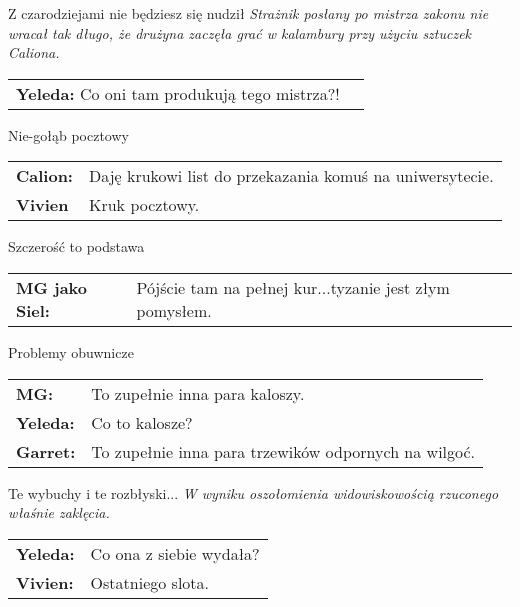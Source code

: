 \documentclass[10pt,twoside,twocolumn]{book}
\begin{document}
\begin{rpg-quotebox}{Z czarodziejami nie będziesz się nudził}
   \textit{Strażnik posłany po mistrza zakonu nie wracał tak długo, że drużyna zaczęła grać w kalambury przy użyciu sztuczek Caliona.} \\

   \begin{tabularx}{\columnwidth}{lX}
      \textbf{Yeleda:} Co oni tam produkują tego mistrza?! 
   \end{tabularx}
\end{rpg-quotebox}


\begin{rpg-quotebox}{Nie-gołąb pocztowy}
   \begin{tabularx}{\columnwidth}{lX}
      \textbf{Calion:} & Daję krukowi list do przekazania komuś na uniwersytecie. \\
      \textbf{Vivien} & Kruk pocztowy.\\
   \end{tabularx}
\end{rpg-quotebox}


\begin{rpg-quotebox}{Szczerość to podstawa}
   \begin{tabularx}{\columnwidth}{lX}
      \textbf{MG jako Siel:} & Pójście tam na pełnej kur...tyzanie jest złym pomysłem. \\
   \end{tabularx}
\end{rpg-quotebox}


\begin{rpg-quotebox}{Problemy obuwnicze}
   \begin{tabularx}{\columnwidth}{lX}
      \textbf{MG:} & To zupełnie inna para kaloszy. \\
      \textbf{Yeleda:} & Co to kalosze? \\
      \textbf{Garret:} & To zupełnie inna para trzewików odpornych na wilgoć.
   \end{tabularx}
\end{rpg-quotebox}


\begin{rpg-quotebox}{Te wybuchy i te rozbłyski...}
   \textit{W wyniku oszołomienia widowiskowością rzuconego właśnie zaklęcia.} \\

   \begin{tabularx}{\columnwidth}{lX}
      \textbf{Yeleda:} & Co ona z siebie wydała? \\
      \textbf{Vivien:} & Ostatniego slota.
   \end{tabularx}
\end{rpg-quotebox}
\end{document}
